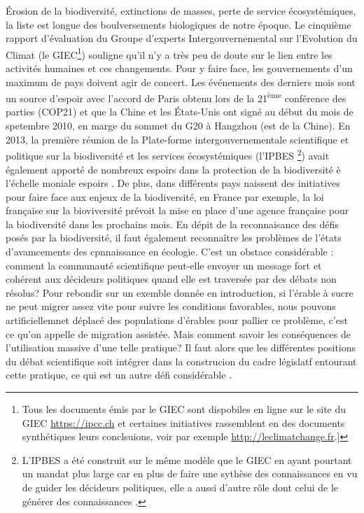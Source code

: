 Érosion de la biodiversité, extinctions de masses, perte de service
écosystémiques, la liste est longue des boulversements biologiques de
notre époque. Le cinquième rapport d'évaluation du Groupe d'experts
Intergouvernemental sur l'Evolution du Climat (le GIEC\footnote{Tous les
  documents émis par le GIEC sont dispobiles en ligne sur le site du
  GIEC \url{https://ipcc.ch} et certaines initiatives rassemblent en des
  documents synthétiques leurs conclsuions, voir par exemple
  \url{http://leclimatchange.fr}.{]}}) souligne qu'il n'y a très peu de
doute sur le lien entre les activités humaines et ces changements. Pour
y faire face, les gouvernements d'un maximum de pays doivent agir de
concert. Les événements des derniers mois sont un source d'espoir avec
l'accord de Paris obtenu lors de la 21\textsuperscript{ème} conférence
des parties (COP21) et que la Chine et les États-Unis ont signé au début
du mois de spetembre 2010, en marge du sommet du G20 à Hangzhou (est de
la Chine). En 2013, la première réunion de la Plate-forme
intergouvernementale scientifique et politique sur la biodiversité et
les services écosystémiques (l'IPBES \footnote{L'IPBES a été construit
  sur le même modèle que le GIEC en ayant pourtant un mandat plus large
  car en plus de faire une sythèse des connaissances en vu de guider les
  décideurs politiques, elle a aussi d'autre rôle dont celui de le
  générer des connaissances \citep{Brooks2014}.}) avait également
apporté de nombreux espoirs dans la protection de la biodiversité è
l'échelle moniale espoirs \citep{Diaz2015a}. De plus, dans différents
pays naissent des initiatives pour faire face aux enjeux de la
biodiversité, en France par exemple, la loi française sur la
bioviversité prévoit la mise en place d'une agence française pour la
biodiversité dans les prochains mois. En dépit de la reconnaisance des
défis posés par la biodiversité, il faut également reconnaître les
problèmes de l'états d'avamcements des cpnnaissance en écologie. C'est
un obstace considérable : comment la communauté scientifique peut-elle
envoyer un message fort et cohérent aux décideurs politiques quand elle
est traversée par des débats non résolus? Pour rebondir sur un exemble
donnée en introduction, si l'érable à sucre ne peut migrer assez vite
pour suivre les conditions favorables, nous pouvons artificiellemnet
déplacé des populations d'érables pour pallier ce problème, c'est ce
qu'on appelle de migration assistée. Mais comment savoir les
conséquences de l'utilisation massive d'une telle pratique? Il faut
alors que les différentes positions du débat scientifique soit intégrer
dans la construcion du cadre législatf entourant cette pratique, ce qui
est un autre défi considérable \citep{McLachlan2007}.

